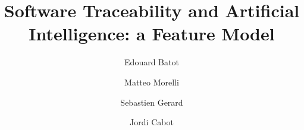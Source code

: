 \documentclass[manuscript]{acmart}
\begin{document}
\title[]{Software Traceability and Artificial Intelligence: a Feature Model} 

\author{Edouard Batot}

\author{Matteo Morelli}
\author{Sebastien Gerard}
\author{Jordi Cabot}




\maketitle



%




%



%







%
\end{document}
